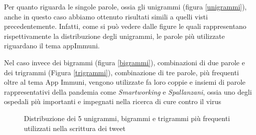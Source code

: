 Per quanto riguarda le singole parole, ossia gli unigrammi (figura \ref{unigrammi}), anche in questo caso abbiamo ottenuto risultati simili a quelli visti precedentemente. Infatti, come si può vedere dalle figure le quali rappresentano rispettivamente la distribuzione degli unigrammi, le parole più utilizzate riguardano il tema appImmuni.

Nel caso invece dei bigrammi (figura \ref{bigrammi}), combinazioni di due parole e dei trigrammi (Figura \ref{trigrammi}), combinazione di tre parole, più frequenti oltre al tema App Immuni, vengono utilizzate fa loro coppie e insiemi di parole rappresentativi della pandemia come \textit{Smartworking} e \textit{Spallanzani}, ossia uno degli ospedali più importanti e impegnati nella ricerca di cure contro il virus 
\begin{figure}[H]
	\centering
	\quad
	\quad
	\setlength{\belowcaptionskip}{-10pt}
	\caption{Distribuzione dei 5 unigrammi, bigrammi e trigrammi più frequenti utilizzati nella scrittura dei tweet}
	\label{fig: ngrams}
\end{figure}

